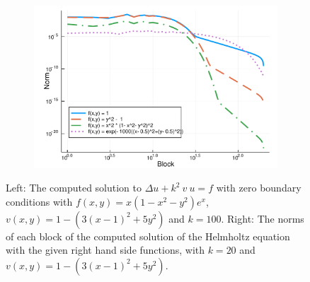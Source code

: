 \documentclass[11pt, oneside]{article}   	%
\begin{document}
\begin{figure}[t]
	\begin{subfigure}{0.5\textwidth}
	\includegraphics[scale=0.5]{solutionblocknorms-helmholtz-k=20} %
	\centering
	\end{subfigure}
	\caption{Left: The computed solution to $\Delta u + k^2 \: v \: u = f$ with zero boundary conditions with $f(x,y) = x(1-x^2-y^2)e^x$, $v(x,y) = 1 - (3(x-1)^2 + 5y^2)$ and $k = 100$. Right: The norms of each block of the computed solution of the Helmholtz equation with the given right hand side functions, with $k=20$ and $v(x,y) = 1 - (3(x-1)^2 + 5y^2)$.}
	\centering
	\label{fig:helmholtz}
\end{figure}
\end{document}
